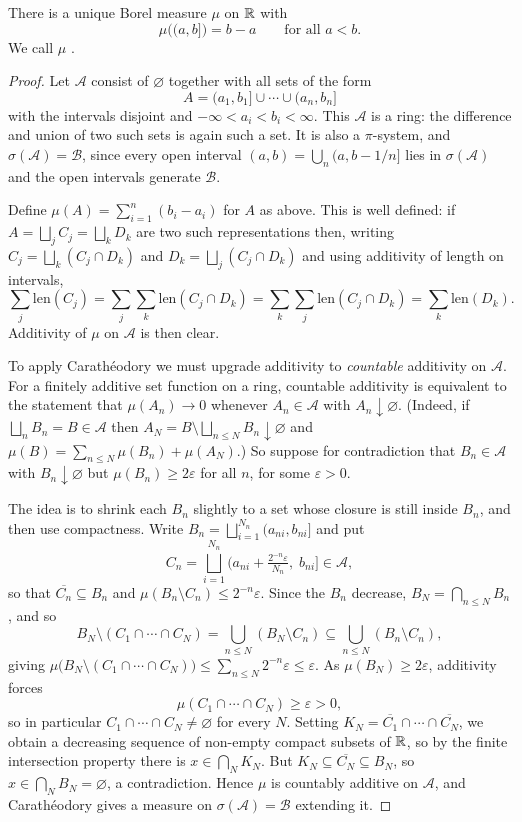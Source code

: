 \documentclass[a4paper]{scrartcl}
\newcommand{\cA}{\mathcal{A}}
\newcommand{\cB}{\mathcal{B}}
\begin{document}
\begin{theorem}\label{pm-thm:lebesgue}
	There is a unique Borel measure $\mu$ on $\mathbb{R}$ with
	$$
	\mu\big( (a,b] \big) = b - a \qquad \text{for all } a < b.
	$$
	We call $\mu$ .
\end{theorem}
\begin{proof}
	Let $\cA$ consist of $\varnothing$ together with all sets of the form
	$$
	A = (a_1, b_1] \cup \cdots \cup (a_n, b_n]
	$$
	with the intervals disjoint and $-\infty < a_i < b_i < \infty$. This $\cA$ is a ring: the difference and union of two such sets is again such a set. It is also a $\pi$-system, and $\sigma(\cA) = \cB$, since every open interval $(a,b) = \bigcup_n (a, b - 1/n]$ lies in $\sigma(\cA)$ and the open intervals generate $\cB$.

	Define $\mu(A) = \sum_{i=1}^n (b_i - a_i)$ for $A$ as above. This is well defined: if $A = \bigsqcup_j C_j = \bigsqcup_k D_k$ are two such representations then, writing $C_j = \bigsqcup_k (C_j \cap D_k)$ and $D_k = \bigsqcup_j (C_j \cap D_k)$ and using additivity of length on intervals,
	$$
	\sum_j \mathrm{len}(C_j) = \sum_j \sum_k \mathrm{len}(C_j \cap D_k) = \sum_k \sum_j \mathrm{len}(C_j \cap D_k) = \sum_k \mathrm{len}(D_k).
	$$
	Additivity of $\mu$ on $\cA$ is then clear.

	To apply Carath\'eodory we must upgrade additivity to \emph{countable} additivity on $\cA$. For a finitely additive set function on a ring, countable additivity is equivalent to the statement that $\mu(A_n) \to 0$ whenever $A_n \in \cA$ with $A_n \downarrow \varnothing$. (Indeed, if $\bigsqcup_n B_n = B \in \cA$ then $A_N = B \setminus \bigsqcup_{n \leq N} B_n \downarrow \varnothing$ and $\mu(B) = \sum_{n \leq N}\mu(B_n) + \mu(A_N)$.) So suppose for contradiction that $B_n \in \cA$ with $B_n \downarrow \varnothing$ but $\mu(B_n) \geq 2\varepsilon$ for all $n$, for some $\varepsilon > 0$.

	The idea is to shrink each $B_n$ slightly to a set whose closure is still inside $B_n$, and then use compactness. Write $B_n = \bigsqcup_{i=1}^{N_n} (a_{ni}, b_{ni}]$ and put
	$$
	C_n = \bigsqcup_{i=1}^{N_n} \Big( a_{ni} + \tfrac{2^{-n}\varepsilon}{N_n},\; b_{ni} \Big] \in \cA,
	$$
	so that $\overline{C_n} \subseteq B_n$ and $\mu(B_n \setminus C_n) \leq 2^{-n}\varepsilon$. Since the $B_n$ decrease, $B_N = \bigcap_{n \leq N} B_n$, and so
	$$
	B_N \setminus (C_1 \cap \cdots \cap C_N) = \bigcup_{n \leq N} (B_N \setminus C_n) \subseteq \bigcup_{n\leq N} (B_n \setminus C_n),
	$$
	giving $\mu\big( B_N \setminus (C_1 \cap \cdots \cap C_N)\big) \leq \sum_{n \leq N} 2^{-n}\varepsilon \leq \varepsilon$. As $\mu(B_N) \geq 2\varepsilon$, additivity forces
	$$
	\mu(C_1 \cap \cdots \cap C_N) \geq \varepsilon > 0,
	$$
	so in particular $C_1 \cap \cdots \cap C_N \neq \varnothing$ for every $N$. Setting $K_N = \overline{C_1} \cap \cdots \cap \overline{C_N}$, we obtain a decreasing sequence of non-empty compact subsets of $\mathbb{R}$, so by the finite intersection property there is $x \in \bigcap_N K_N$. But $K_N \subseteq \overline{C_N} \subseteq B_N$, so $x \in \bigcap_N B_N = \varnothing$, a contradiction. Hence $\mu$ is countably additive on $\cA$, and Carath\'eodory gives a measure on $\sigma(\cA) = \cB$ extending it.


\end{proof}
\end{document}
